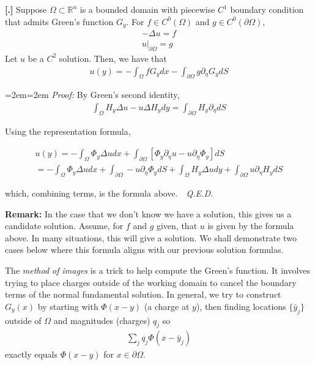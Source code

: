\documentclass{article}
\newcommand{\R}{{\mathbb{R}}}
\newcommand{\pd}{\partial}
\newcounter{result}[section]
\newenvironment{res}[1][]{\refstepcounter{result}\par\medskip
	\noindent \textbf{[\thesection.\theresult] #1} \rmfamily}{\medskip}
\newenvironment{pf}{%
	\par%
	\medskip
	\leftskip=2em\rightskip=2em%
	\noindent\ignorespaces \textit{Proof:} \newline}{%
	\,\, \newline \textit{Q.E.D.}\par\medskip}
\begin{document}
	
	\begin{res}
		Suppose $\Omega \subset \R^{n}$ is a bounded domain with piecewise $C^{1}$ boundary condition that admits Green's function $G_{y}$. For $f \in C^{0}(\Omega)$ and $g \in C^{0}(\pd \Omega)$, 
		\begin{align*}
			-\Delta u = f \\ u|_{\pd \Omega} = g
		\end{align*}
		Let $u$ be a $C^{2}$ solution. Then, we have that 
		\begin{align*}
			u(y) = - \int_{\Omega} f G_{y} dx - \int_{\pd \Omega} g \pd_{\eta} G_{y} dS
		\end{align*}
	\end{res} 
	\begin{pf}
		By Green's second identity,
		\begin{align*}
			\int_{\Omega} H_{y} \Delta u - u \Delta H_{y} dy = \int_{\pd \Omega} H_{y} \pd_{\eta}  dS
		\end{align*} 
		
		Using the representation formula, 
		
		\begin{align*}
			u(y) =- \int_{\Omega} \Phi_{y}\Delta u dx + \int_{\pd \Omega} \left[\Phi_{y}\pd_{\eta} u - u \pd_{\eta} \Phi_{y} \right] dS  \\
			= - \int_{\Omega} \Phi_{y}\Delta u dx + \int_{\pd \Omega}  - u \pd_{\eta} \Phi_{y}  dS + \int_{\Omega} H_{y} \Delta u dy + \int_{\pd \Omega} u \pd_{\eta}H_{y} dS 
		\end{align*}
		
		which, combining terms, is the formula above. 
	\end{pf}
	
	\textbf{Remark:} In the case that we don't know we have a solution, this gives us a candidate solution. Assume, for $f$ and $g$ given, that $u$ is given by the formula above. In many situations, this will give a solution. We shall demonstrate two cases below where this formula aligns with our previous solution formulas. 
	
	The \textit{method of images} is a trick to help compute the Green's function. It involves trying to place charges outside of the working domain to cancel the boundary terms of the normal fundamental solution. In general, we try to construct $G_{y}(x)$ by starting with $\Phi(x-y)$ (a charge at $y$), then finding locations $\{\bar{y}_{j}\}$ outside of $\Omega$ and magnitudes (charges) $q_{j}$ so 
	\begin{align*}
		\sum_{j} q_{j} \Phi(x-\bar{y}_{j})
	\end{align*}
	exactly equals $\Phi(x-y)$ for $x \in \pd \Omega$.
	
\end{document}
